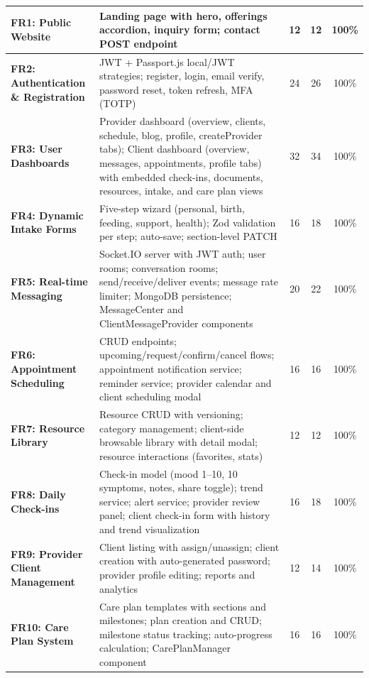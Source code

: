 \documentclass[12pt,letterpaper]{article}
\begin{document}
{\begin{longtable}{|>{\raggedright\arraybackslash}p{2.8cm}|>{\raggedright\arraybackslash}p{6.5cm}|c|c|c|}
\textbf{FR1: Public Website} & Landing page with hero, offerings accordion, inquiry form; contact POST endpoint & 12 & 12 & 100\% \\
\hline
\rowcolor{TableRowAlt}
\textbf{FR2: Authentication \& Registration} & JWT + Passport.js local/JWT strategies; register, login, email verify, password reset, token refresh, MFA (TOTP) & 24 & 26 & 100\% \\
\hline
\textbf{FR3: User Dashboards} & Provider dashboard (overview, clients, schedule, blog, profile, createProvider tabs); Client dashboard (overview, messages, appointments, profile tabs) with embedded check-ins, documents, resources, intake, and care plan views & 32 & 34 & 100\% \\
\hline
\rowcolor{TableRowAlt}
\textbf{FR4: Dynamic Intake Forms} & Five-step wizard (personal, birth, feeding, support, health); Zod validation per step; auto-save; section-level PATCH & 16 & 18 & 100\% \\
\hline
\textbf{FR5: Real-time Messaging} & Socket.IO server with JWT auth; user rooms; conversation rooms; send/receive/deliver events; message rate limiter; MongoDB persistence; MessageCenter and ClientMessageProvider components & 20 & 22 & 100\% \\
\hline
\rowcolor{TableRowAlt}
\textbf{FR6: Appointment Scheduling} & CRUD endpoints; upcoming/request/confirm/cancel flows; appointment notification service; reminder service; provider calendar and client scheduling modal & 16 & 16 & 100\% \\
\hline
\textbf{FR7: Resource Library} & Resource CRUD with versioning; category management; client-side browsable library with detail modal; resource interactions (favorites, stats) & 12 & 12 & 100\% \\
\hline
\rowcolor{TableRowAlt}
\textbf{FR8: Daily Check-ins} & Check-in model (mood 1--10, 10 symptoms, notes, share toggle); trend service; alert service; provider review panel; client check-in form with history and trend visualization & 16 & 18 & 100\% \\
\hline
\textbf{FR9: Provider Client Management} & Client listing with assign/unassign; client creation with auto-generated password; provider profile editing; reports and analytics & 12 & 14 & 100\% \\
\hline
\rowcolor{TableRowAlt}
\textbf{FR10: Care Plan System} & Care plan templates with sections and milestones; plan creation and CRUD; milestone status tracking; auto-progress calculation; CarePlanManager component & 16 & 16 & 100\% \\

\end{longtable}}
\end{document}
